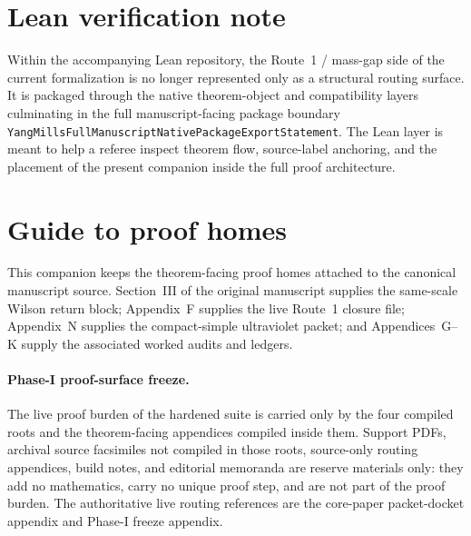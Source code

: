 \documentclass[preprint,aip,jmp,amsmath,amssymb,nofootinbib]{revtex4-2}
\begin{document}
\begin{abstract}
This companion is the proof home for the ultraviolet/public-scope gate and the Route~1 mass-gap chain. It is assembled directly from the canonical March~16,~2026 LaTeX source tree. The document preserves the theorem-facing routing used by the core paper and incorporates the authoritative same-scale Wilson return block, the live Route~1 closure file, the compact-simple ultraviolet packet, and the associated worked audits and ledgers from the canonical source.
\end{abstract}
\maketitle
\section*{Lean verification note}
Within the accompanying Lean repository, the Route~1 / mass-gap side of the
current formalization is no longer represented only as a structural routing
surface. It is packaged through the native theorem-object and compatibility
layers culminating in the full manuscript-facing package boundary
\texttt{YangMillsFullManuscriptNativePackageExportStatement}. The Lean layer is
meant to help a referee inspect theorem flow, source-label anchoring, and the
placement of the present companion inside the full proof architecture.
\section*{Guide to proof homes}
This companion keeps the theorem-facing proof homes attached to the canonical manuscript source. Section~III of the original manuscript supplies the same-scale Wilson return block; Appendix~F supplies the live Route~1 closure file; Appendix~N supplies the compact-simple ultraviolet packet; and Appendices~G--K supply the associated worked audits and ledgers.

\paragraph{Phase-I proof-surface freeze.}
The live proof burden of the hardened suite is carried only by the four compiled roots and the theorem-facing appendices compiled inside them. Support PDFs, archival source facsimiles not compiled in those roots, source-only routing appendices, build notes, and editorial memoranda are reserve materials only: they add no mathematics, carry no unique proof step, and are not part of the proof burden. The authoritative live routing references are the core-paper packet-docket appendix and Phase-I freeze appendix.
\end{document}
